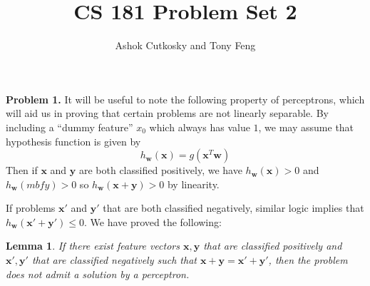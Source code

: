\documentclass[12pt]{amsart}
\title{CS 181 Problem Set 2}
\author{Ashok Cutkosky and Tony Feng}
\newcommand{\mbf}[1]{\mathbf{#1}}
\newtheorem{lemma}[thm]{Lemma}
\theoremstyle{remark}
\begin{document}
\maketitle

\noindent \textbf{Problem 1.} It will be useful to note the following property of perceptrons, which will aid us in proving that certain problems are not linearly separable. By including a ``dummy feature'' $x_0$ which always has value $1$, we may assume that hypothesis function is given by 
\[
h_{\mbf{w}}(\mbf{x}) = g(\mbf{x}^T \mbf{w})
\]
Then if $\mbf{x}$ and $\mbf{y}$ are both classified positively, we have $h_{\mbf{w}}(\mbf{x}) >0 $ and $h_{\mbf{w}}(mbf{y}) > 0$ so $h_{\mbf{w}}(\mbf{x}+\mbf{y}) > 0$ by linearity. 

If problems $\mbf{x}'$ and $\mbf{y}'$ that are both classified negatively, similar logic implies that $h_{\mbf{w}}(\mbf{x}'+\mbf{y}') \leq 0$. We have proved the following: 

\begin{lemma}\label{no_perceptron}
If there exist feature vectors $\mbf{x}, \mbf{y}$ that are classified positively and $\mbf{x}', \mbf{y}'$ that are classified negatively such that $\mbf{x} + \mbf{y} = \mbf{x}' + \mbf{y}'$, then the problem does not admit a solution by a perceptron. 
\end{lemma}
\end{document}

